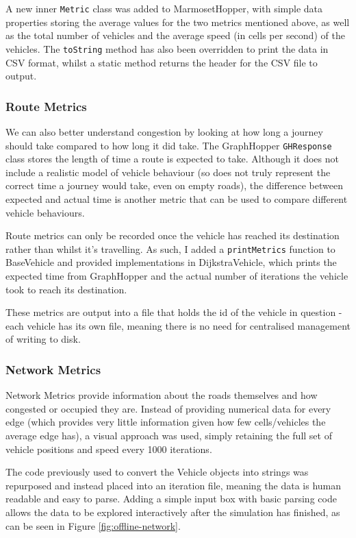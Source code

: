 \documentclass[ %
                    author={Alexander Hill},
                supervisor={Dr. Benjamin Sach},
                    degree={MEng},
                     title={MARMOSET},
                  subtitle={Multi-Agent Route Management using Online Simulation for Efficient Transportation},
                      type={research},
                      year={2016} ]{dissertation}
\begin{document}
A new inner \texttt{Metric} class was added to MarmosetHopper, with simple data
properties storing the average values for the two metrics mentioned above, as
well as the total number of vehicles and the average speed (in cells per second)
of the vehicles. The \texttt{toString} method has also been overridden to print
the data in CSV format, whilst a static method returns the header for the CSV
file to output.

\subsubsection{Route Metrics}

We can also better understand congestion by looking at how long a journey should
take compared to how long it did take. The GraphHopper \texttt{GHResponse} class
stores the length of time a route is expected to take. Although it does not
include a realistic model of vehicle behaviour (so does not truly represent the
correct time a journey would take, even on empty roads), the difference between
expected and actual time is another metric that can be used to compare different
vehicle behaviours.

Route metrics can only be recorded once the vehicle has reached its destination
rather than whilst it's travelling. As such, I added a \texttt{printMetrics}
function to BaseVehicle and provided implementations in DijkstraVehicle, which
prints the expected time from GraphHopper and the actual number of iterations
the vehicle took to reach its destination.

These metrics are output into a file that holds the id of the vehicle in
question - each vehicle has its own file, meaning there is no need for
centralised management of writing to disk.

\subsubsection{Network Metrics}

Network Metrics provide information about the roads themselves and how congested
or occupied they are. Instead of providing numerical data for every edge (which
provides very little information given how few cells/vehicles the average edge
has), a visual approach was used, simply retaining the full set of vehicle
positions and speed every 1000 iterations.

The code previously used to convert the Vehicle objects into strings was
repurposed and instead placed into an iteration file, meaning the data is human
readable and easy to parse. Adding a simple input box with basic parsing code
allows the data to be explored interactively after the simulation has finished,
as can be seen in Figure \ref{fig:offline-network}.
\end{document}
